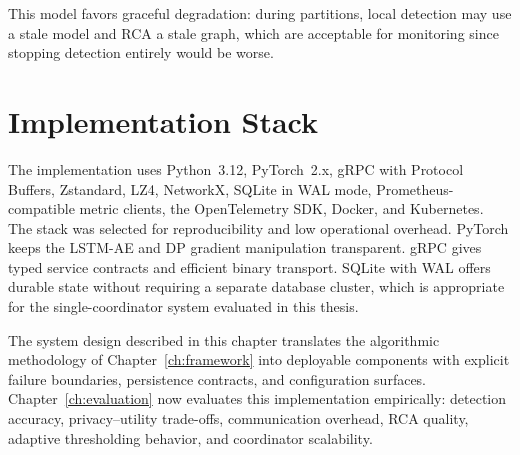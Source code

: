This model favors graceful degradation: during partitions, local detection may
use a stale model and RCA a stale graph, which are acceptable for monitoring
since stopping detection entirely would be worse.

\section{Implementation Stack}
\label{subsec:design_stack}

The implementation uses Python~3.12, PyTorch~2.x, gRPC with Protocol Buffers,
Zstandard, LZ4, NetworkX, SQLite in WAL mode, Prometheus-compatible metric
clients, the OpenTelemetry SDK, Docker, and Kubernetes. The stack was selected
for reproducibility and low operational overhead. PyTorch keeps the LSTM-AE and
DP gradient manipulation transparent. gRPC gives typed service contracts and
efficient binary transport. SQLite with WAL offers durable state without
requiring a separate database cluster, which is appropriate for the
single-coordinator system evaluated in this thesis.

The system design described in this chapter translates the algorithmic
methodology of Chapter~\ref{ch:framework} into deployable components with
explicit failure boundaries, persistence contracts, and configuration surfaces.
Chapter~\ref{ch:evaluation} now evaluates this implementation empirically:
detection accuracy, privacy--utility trade-offs, communication overhead, RCA
quality, adaptive thresholding behavior, and coordinator scalability.
